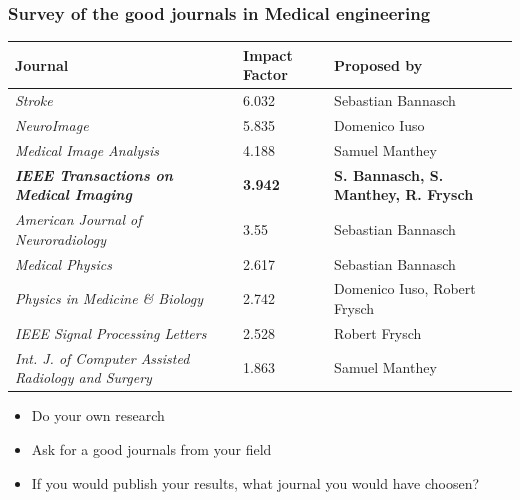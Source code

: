 \begin{frame}
\frametitle{Survey of the good journals in Medical engineering}
\begin{table}[]
\centering
\label{my-label}
\tiny{\begin{tabular}{@{}lll@{}}
\toprule
\textbf{Journal}                                            & \textbf{Impact Factor} & \textbf{Proposed by}                        \\ \midrule
\textit{Stroke}                                             & 6.032                  & Sebastian Bannasch                          \\
\textit{NeuroImage}                                         & 5.835                  & Domenico Iuso                               \\
\textit{Medical Image Analysis}                             & 4.188                  & Samuel Manthey                              \\
\textit{\textbf{IEEE Transactions on Medical Imaging}}      & \textbf{3.942}         & \textbf{S. Bannasch, S. Manthey, R. Frysch} \\
\textit{American Journal of Neuroradiology}                 & 3.55                   & Sebastian Bannasch                          \\
\textit{Medical Physics}                                    & 2.617                  & Sebastian Bannasch                          \\
\textit{Physics in Medicine \& Biology}                     & 2.742                  & Domenico Iuso, Robert Frysch                \\
\textit{IEEE Signal Processing Letters}                     & 2.528                  & Robert Frysch                               \\
\textit{Int. J. of Computer Assisted Radiology and Surgery} & 1.863                  & Samuel Manthey                              \\ \bottomrule
\end{tabular}}
\end{table}

\footnotesize{
\begin{itemize}
\item Do your own research
\item Ask for a good journals from your field
\item If you would publish your results, what journal you would have choosen?
\end{itemize}
}
\end{frame}

